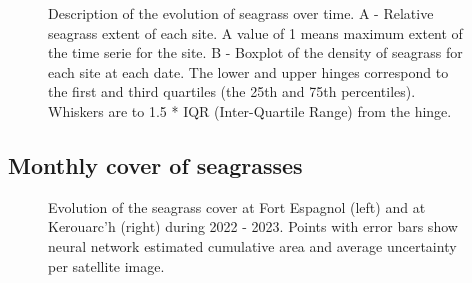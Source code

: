 \documentclass[
  number]{elsarticle}
\begin{document}
\label{cell-fig-Extent}
\begin{figure}[H]


\caption{\label{fig-Extent}Description of the evolution of seagrass over
time. A - Relative seagrass extent of each site. A value of 1 means
maximum extent of the time serie for the site. B - Boxplot of the
density of seagrass for each site at each date. The lower and upper
hinges correspond to the first and third quartiles (the 25th and 75th
percentiles). Whiskers are to 1.5 * IQR (Inter-Quartile Range) from the
hinge.}

\end{figure}%

\subsection{Monthly cover of
seagrasses}\label{monthly-cover-of-seagrasses}

\label{cell-fig-Pheno}
\begin{figure}[H]


\caption{\label{fig-Pheno}Evolution of the seagrass cover at Fort
Espagnol (left) and at Kerouarc'h (right) during 2022 - 2023. Points
with error bars show neural network estimated cumulative area and
average uncertainty per satellite image.}

\end{figure}%
\end{document}
